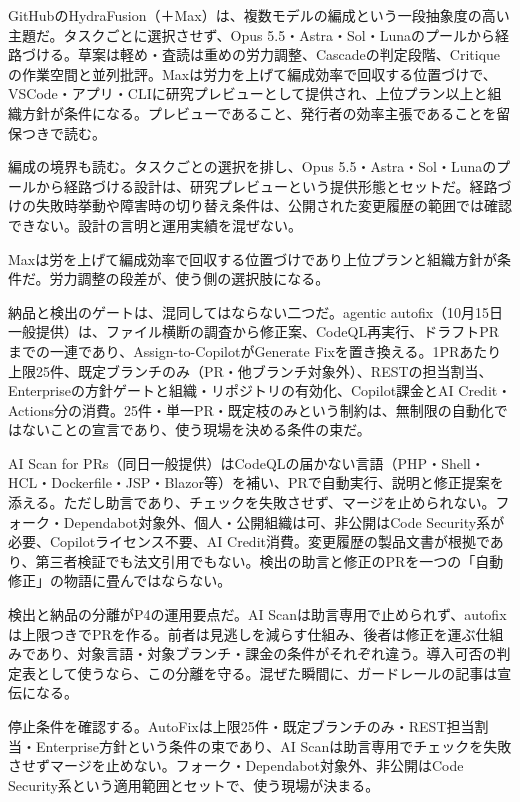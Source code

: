 \documentclass[lualatex,a4paper,10pt]{jlreq}
\begin{document}
GitHubのHydraFusion（＋Max）は、複数モデルの編成という一段抽象度の高い主題だ。タスクごとに選択させず、Opus 5.5・Astra・Sol・Lunaのプールから経路づける。草案は軽め・査読は重めの労力調整、Cascadeの判定段階、Critiqueの作業空間と並列批評。Maxは労力を上げて編成効率で回収する位置づけで、VSCode・アプリ・CLIに研究プレビューとして提供され、上位プラン以上と組織方針が条件になる。プレビューであること、発行者の効率主張であることを留保つきで読む。
\cite{B33,B76}


編成の境界も読む。タスクごとの選択を排し、Opus 5.5・Astra・Sol・Lunaのプールから経路づける設計は、研究プレビューという提供形態とセットだ。経路づけの失敗時挙動や障害時の切り替え条件は、公開された変更履歴の範囲では確認できない。設計の言明と運用実績を混ぜない。
\cite{B33,B76}


Maxは労を上げて編成効率で回収する位置づけであり上位プランと組織方針が条件だ。労力調整の段差が、使う側の選択肢になる。
\cite{B33,B76}


納品と検出のゲートは、混同してはならない二つだ。agentic autofix（10月15日一般提供）は、ファイル横断の調査から修正案、CodeQL再実行、ドラフトPRまでの一連であり、Assign-to-CopilotがGenerate Fixを置き換える。1PRあたり上限25件、既定ブランチのみ（PR・他ブランチ対象外）、RESTの担当割当、Enterpriseの方針ゲートと組織・リポジトリの有効化、Copilot課金とAI Credit・Actions分の消費。25件・単一PR・既定枝のみという制約は、無制限の自動化ではないことの宣言であり、使う現場を決める条件の束だ。
\cite{B34,B77}


AI Scan for PRs（同日一般提供）はCodeQLの届かない言語（PHP・Shell・HCL・Dockerfile・JSP・Blazor等）を補い、PRで自動実行、説明と修正提案を添える。ただし助言であり、チェックを失敗させず、マージを止められない。フォーク・Dependabot対象外、個人・公開組織は可、非公開はCode Security系が必要、Copilotライセンス不要、AI Credit消費。変更履歴の製品文書が根拠であり、第三者検証でも法文引用でもない。検出の助言と修正のPRを一つの「自動修正」の物語に畳んではならない。
\cite{B35,B78}


検出と納品の分離がP4の運用要点だ。AI Scanは助言専用で止められず、autofixは上限つきでPRを作る。前者は見逃しを減らす仕組み、後者は修正を運ぶ仕組みであり、対象言語・対象ブランチ・課金の条件がそれぞれ違う。導入可否の判定表として使うなら、この分離を守る。混ぜた瞬間に、ガードレールの記事は宣伝になる。
\cite{B34,B77,B35,B78}


停止条件を確認する。AutoFixは上限25件・既定ブランチのみ・REST担当割当・Enterprise方針という条件の束であり、AI Scanは助言専用でチェックを失敗させずマージを止めない。フォーク・Dependabot対象外、非公開はCode Security系という適用範囲とセットで、使う現場が決まる。
\cite{B34,B77,B35,B78}
\end{document}
